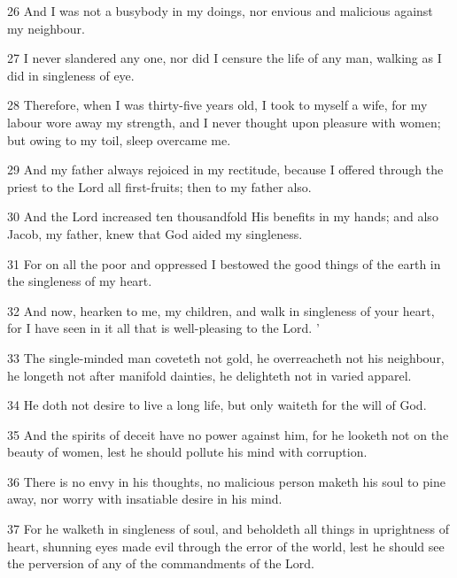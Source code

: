 \par 26 And I was not a busybody in my doings, nor envious and malicious against my neighbour.

\par 27 I never slandered any one, nor did I censure the life of any man, walking as I did in singleness of eye.

\par 28 Therefore, when I was thirty-five years old, I took to myself a wife, for my labour wore away my strength, and I never thought upon pleasure with women; but owing to my toil, sleep overcame me.

\par 29 And my father always rejoiced in my rectitude, because I offered through the priest to the Lord all first-fruits; then to my father also.

\par 30 And the Lord increased ten thousandfold His benefits in my hands; and also Jacob, my father, knew that God aided my singleness.

\par 31 For on all the poor and oppressed I bestowed the good things of the earth in the singleness of my heart.

\par 32 And now, hearken to me, my children, and walk in singleness of your heart, for I have seen in it all that is well-pleasing to the Lord. '

\par 33 The single-minded man coveteth not gold, he overreacheth not his neighbour, he longeth not after manifold dainties, he delighteth not in varied apparel.

\par 34 He doth not desire to live a long life, but only waiteth for the will of God.

\par 35 And the spirits of deceit have no power against him, for he looketh not on the beauty of women, lest he should pollute his mind with corruption.

\par 36 There is no envy in his thoughts, no malicious person maketh his soul to pine away, nor worry with insatiable desire in his mind.

\par 37 For he walketh in singleness of soul, and beholdeth all things in uprightness of heart, shunning eyes made evil through the error of the world, lest he should see the perversion of any of the commandments of the Lord.

